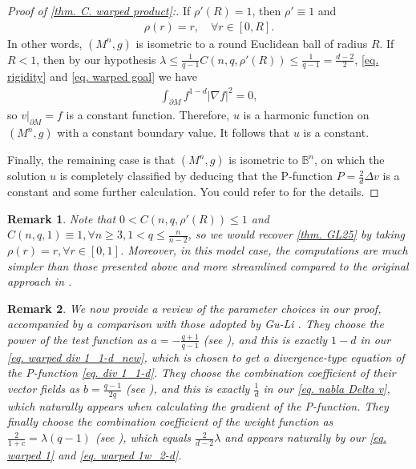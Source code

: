 \documentclass[12pt]{amsart}%
\newtheorem{remark}{Remark}
\numberwithin{equation}{section}
\numberwithin{lemma}{section}
\numberwithin{proposition}{section}
\numberwithin{corollary}{section}
\numberwithin{remark}{section}
\begin{document}
\begin{proof}[Proof of \cref{thm. C. warped product}:]
        If $\rho'(R)=1$, then $\rho'\equiv 1$ and 
        \begin{align*}
            \rho(r)=r,\quad \forall r\in[0,R].
        \end{align*}
        In other words, $(M^n,g)$ is isometric to a round Euclidean ball of radius $R$. If $R<1$, then by our hypothesis  $\lambda\leq \frac{1}{q-1}C(n,q,\rho'(R))\leq \frac{1}{q-1}=\frac{d-2}{2}$, \cref{eq. rigidity} and \cref{eq. warped goal} we have
        \begin{align*}
            \int_{\partial M}f^{1-d}|\nabla f|^2=0,
        \end{align*}
        so $v|_{\partial M}=f$ is a constant function. Therefore, $u$ is a harmonic function on $(M^n,g)$ with a constant boundary value. It follows that $u$ is a constant.

        Finally, the remaining case is that $(M^n,g)$ is isometric to $\mathbb{B}^n$, on which the solution $u$ is completely classified by deducing that the P-function $P=\frac{2}{d}\Delta v$ is a constant and some further calculation. You could refer to \cite[Page 3515-3516]{GL25} for the details.
\end{proof}
\begin{remark}
    Note that $0< C(n,q,\rho'(R))\leq 1$ and $C(n,q,1)\equiv 1, \forall n\geq 3, 1<q\leq \frac{n}{n-2}$, so we would recover \cref{thm. GL25} by taking $\rho(r)=r,\forall r\in[0,1]$. Moreover, in this model case, the computations are much simpler than those presented above and more streamlined compared to the original approach in \cite{GL25}.
\end{remark}
\begin{remark}
    We now provide a review of the parameter choices in our proof, accompanied by a comparison with those adopted by Gu-Li \cite{GL25}.
    They choose the power of the test function as $a=-\frac{q+1}{q-1}$ (see \cite[Section 3.1]{GL25}), and this is exactly $1-d$ in our \cref{eq. warped div 1_1-d_new}, which is chosen to get a divergence-type equation of the P-function \cref{eq. div 1_1-d}. 
    They choose the combination coefficient of their vector fields as $b=\frac{q-1}{2q}$ (see \cite[Section 3.2]{GL25}), and this is exactly $\frac{1}{d}$ in our \cref{eq. nabla Delta v}, which naturally appears when calculating the gradient of the P-function. 
    They finally choose the combination coefficient of the weight function as $\frac{2}{1+c}=\lambda(q-1)$ (see \cite[Section 3.3]{GL25}), which equals $\frac{2}{d-2}\lambda$ and appears naturally by our \cref{eq. warped 1} and \cref{eq. warped 1w_2-d}.
\end{remark}
\end{document}
